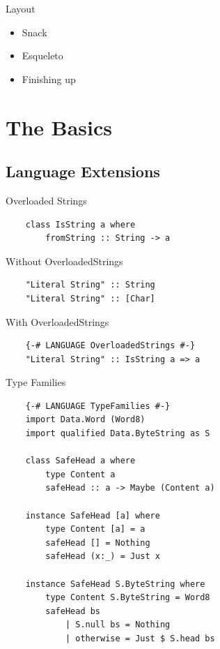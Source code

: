 \documentclass[pdf]{beamer}
\begin{document}
\begin{frame}{Layout}
  \begin{itemize}
  \item<1-> Snack
  \item<2-> Esqueleto
  \item<2> Finishing up
  \end{itemize}
\end{frame}

\section{The Basics}

\subsection{Language Extensions}
\begin{frame}[fragile]{Overloaded Strings}
  \begin{verbatim}
    class IsString a where
        fromString :: String -> a
  \end{verbatim}
  \pause
  \vspace{1em}
  Without OverloadedStrings
  \begin{verbatim}
    "Literal String" :: String
    "Literal String" :: [Char]
  \end{verbatim}
  \pause
  \vspace{1em}
  With OverloadedStrings
  \begin{verbatim}
    {-# LANGUAGE OverloadedStrings #-}
    "Literal String" :: IsString a => a
  \end{verbatim}
\end{frame}

\begin{frame}[fragile]{Type Families}
  \begin{verbatim}
    {-# LANGUAGE TypeFamilies #-}
    import Data.Word (Word8)
    import qualified Data.ByteString as S
    
    class SafeHead a where
        type Content a
        safeHead :: a -> Maybe (Content a)
    
    instance SafeHead [a] where
        type Content [a] = a
        safeHead [] = Nothing
        safeHead (x:_) = Just x
    
    instance SafeHead S.ByteString where
        type Content S.ByteString = Word8
        safeHead bs
            | S.null bs = Nothing
            | otherwise = Just $ S.head bs
  \end{verbatim}
\end{frame}
\end{document}
